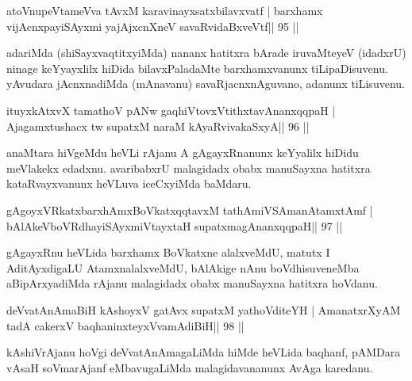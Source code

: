 \begin{shl}
atoV\s nupeVtameVva tAvxM karavinayxsatxbilavxvatf |
barxhamx vijAcnxpayiSAyxmi yajAjxcnXneV savaRvidaBxveVtf\hfill || 95 ||
\end{shl}

\begin{artha}
adariMda (shiSayxvaqtitxyiMda) nananx hatitxra bArade iruvaMteyeV (idadxrU) ninage keYyayxlilx hiDida bilavxPaladaMte barxhamxvanunx  tiLipaDisuvenu. yAvudara jAcnxnadiMda (mAnavanu) savaRjacnxnAguvano, adanunx tiLisuvenu.
\end{artha}

\begin{shl}
ituyxkAtxvX tamathoV pANw gaqhiVtovxVtithxtavAnanxqqpaH |
Ajagamxtushacx tw supatxM naraM kAyaRvivakaSxyA\hfill || 96 ||
\end{shl}

\begin{artha}
anaMtara hiVgeMdu heVLi rAjanu A gAgayxRnanunx keYyalilx hiDidu meVlakekx edadxnu. avaribabxrU malagidadx obabx manuSayxna hatitxra kataRvayxvanunx heVLuva iceCxyiMda baMdaru.
\end{artha} 
 


\begin{shl}
gAgoyxVRkatxbarxhAmxBoVkatxqqtavxM tathA\s miVSAmanAtamxtAmf |
bAlAkeVboVRdhayiSAyxmiVtayxtaH supatxmagAnanxqqpaH\hfill || 97 ||
\end{shl}

\begin{artha}
gAgayxRnu heVLida barxhamx BoVkatxne alalxveMdU, matutx I AditAyxdigaLU AtamxnalalxveMdU, bAlAkige nAnu boVdhisuveneMba aBipArxyadiMda rAjanu malagidadx obabx manuSayxna hatitxra hoVdanu.
\end{artha}
 

\begin{shl}
deVvatAnAmaBiH kAshoyxV gatAvx supatxM yathoVditeYH |
AmanatxrXyAM tadA cakerxV baqhaninxteyxVvamAdiBiH\hfill || 98 ||
\end{shl}

\begin{artha}
kAshiVrAjanu hoVgi deVvatAnAmagaLiMda hiMde heVLida baqhanf,  pAMDara	vAsaH soVmarAjanf eMbavugaLiMda malagidavananunx AvAga karedanu.
\end{artha}


